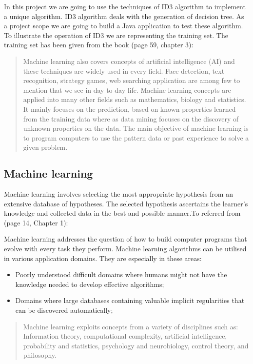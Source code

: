 \documentclass{report}
\begin{document}
In this project we are going to use the techniques of ID3 algorithm to implement a unique algorithm. ID3 algorithm deals with the generation of decision tree. As a project scope we are going to build a Java application to test these algorithm. To illustrate the operation of ID3 we are representing the training set.
The training set has been given from the book \cite{Mitchell1997MachineLearning}(page 59, chapter 3):
\begin{quote}
  Machine learning also covers concepts of artificial intelligence (AI) and these techniques are widely used in every field. Face detection, text recognition, strategy games, web searching application are among few to mention that we see in day-to-day life. Machine learning concepts are applied into many other fields such as mathematics, biology and statistics. It mainly focuses on the prediction, based on known properties learned from the training data where as data mining focuses on the discovery of unknown properties on the data.
  The main objective of machine learning is to program computers to use the pattern data or past experience to solve a given problem.
\end{quote}


\subsection{Machine learning}
\label{sec:machinelearn}

Machine learning involves selecting the most appropriate hypothesis from an extensive database of hypotheses. The selected hypothesis ascertains the learner's knowledge and collected data in the best and possible manner.To referred  from \cite{Mitchell1997MachineLearning}(page 14, Chapter 1):

Machine learning addresses the question of how to build computer programs that evolve with every task they perform. Machine learning algorithms can be utilised in various application domains. They are especially in these areas: 
\begin{itemize}
\item Poorly understood difficult domains where humans might not have the knowledge needed to develop effective algorithms;
\item Domains where large databases containing valuable implicit regularities that can be discovered automatically;
\end{itemize}

\begin{quote}
Machine learning exploits concepts from a variety of disciplines such as: Information theory, computational complexity, artificial intelligence, probability and statistics, psychology and neurobiology, control theory, and philosophy.
\end{quote}
\end{document}
